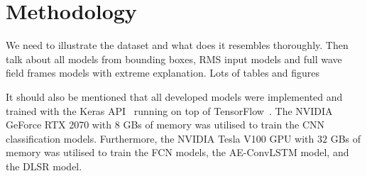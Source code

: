 \chapter[Methodology]{Methodology}
\label{ch4}


We need to illustrate the dataset and what does it resembles thoroughly.
Then talk about all models from bounding boxes, RMS input models and full wave field frames models with extreme explanation. Lots of tables and figures



It should also be mentioned that all developed models were implemented and trained with the Keras API~\cite{chollet2015keras} running on top of TensorFlow~\cite{Abadi2016}.
The NVIDIA GeForce RTX 2070 with \(8\) GBs of memory was utilised to train the CNN classification models.
Furthermore, the NVIDIA Tesla V100 GPU with \(32\) GBs of memory was utilised to train the FCN models, the AE-ConvLSTM model, and the DLSR model.







